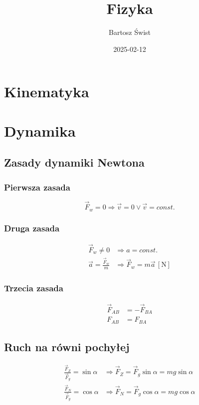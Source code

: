 \documentclass{article}
\title{Fizyka}
\date{2025-02-12}
\author{Bartosz Świst}
\numberwithin{equation}{section}
\newcommand{\unit}[1]{\, \left[\mathrm{#1}\right]}
\begin{document}
  \maketitle
  \newpage
  \section{Kinematyka}

  \newpage
  \section{Dynamika}
    \subsection{Zasady dynamiki Newtona}
      \subsubsection{Pierwsza zasada}
        \begin{equation}
          \vec F_w = 0 \Rightarrow \vec v = 0 \lor \vec v = const.
        \end{equation}
      \subsubsection{Druga zasada}
        \begin{align}
          \vec F_w \ne 0 &\Rightarrow a = const.\\
          \vec a = \frac{\vec F_w}{m} &\Rightarrow \vec F_w = m\vec a \unit{N}
        \end{align}
      \subsubsection{Trzecia zasada}
        \begin{align}
          \vec F_{AB} &= -\vec F_{BA}\\
          F_{AB} &= F_{BA}
        \end{align}
    \subsection{Ruch na równi pochyłej}
      \begin{align}
        \frac{\vec F_Z}{\vec F_g} = \sin\alpha &\Rightarrow \vec F_Z = \vec F_g\sin\alpha = mg\sin\alpha\\
        \frac{\vec F_N}{\vec F_g} = \cos\alpha &\Rightarrow \vec F_N = \vec F_g\cos\alpha = mg\cos\alpha
      \end{align}
\end{document}
